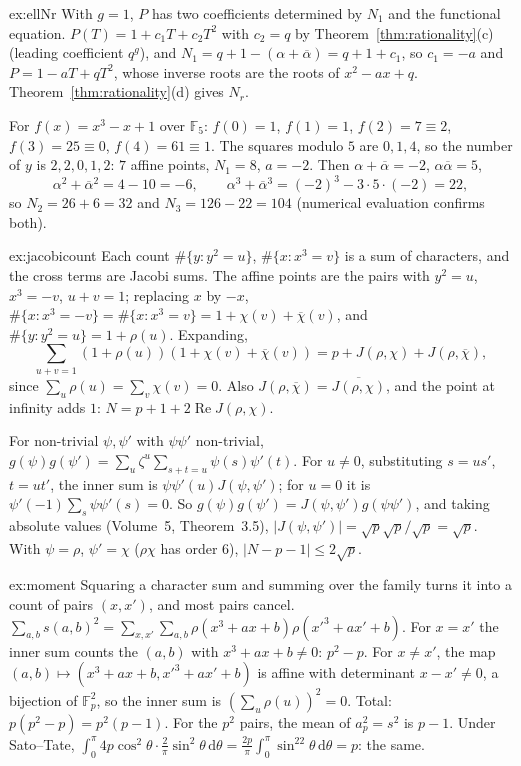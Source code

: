 \begin{solution}{ex:ellNr}
\idea With $g=1$, $P$ has two coefficients determined by $N_1$ and the functional equation.
\writeup $P(T)=1+c_1T+c_2T^2$ with $c_2=q$ by Theorem~\ref{thm:rationality}(c) (leading coefficient $q^g$), and $N_1=q+1-(\alpha+\overline\alpha)=q+1+c_1$, so
$c_1=-a$ and $P=1-aT+qT^2$, whose inverse roots are the roots of $x^2-ax+q$. Theorem~\ref{thm:rationality}(d) gives $N_r$.

For $f(x)=x^3-x+1$ over $\mathbb F_5$: $f(0)=1$, $f(1)=1$, $f(2)=7\equiv2$, $f(3)=25\equiv0$, $f(4)=61\equiv1$. The squares modulo $5$ are $0,1,4$, so the number of $y$
is $2,2,0,1,2$: $7$ affine points, $N_1=8$, $a=-2$. Then $\alpha+\overline\alpha=-2$, $\alpha\overline\alpha=5$,
\[
\alpha^2+\overline\alpha^2=4-10=-6,\qquad\alpha^3+\overline\alpha^3=(-2)^3-3\cdot5\cdot(-2)=22,
\]
so $N_2=26+6=32$ and $N_3=126-22=104$ (numerical evaluation confirms both).
\end{solution}

\begin{solution}{ex:jacobicount}
\idea Each count $\#\{y:y^2=u\}$, $\#\{x:x^3=v\}$ is a sum of characters, and the cross terms are Jacobi sums.
\writeup The affine points are the pairs with $y^2=u$, $x^3=-v$, $u+v=1$; replacing $x$ by $-x$, $\#\{x:x^3=-v\}=\#\{x:x^3=v\}=1+\chi(v)+\overline\chi(v)$, and
$\#\{y:y^2=u\}=1+\rho(u)$. Expanding,
\[
\sum_{u+v=1}(1+\rho(u))(1+\chi(v)+\overline\chi(v))=p+J(\rho,\chi)+J(\rho,\overline\chi),
\]
since $\sum_u\rho(u)=\sum_v\chi(v)=0$. Also $J(\rho,\overline\chi)=\overline{J(\rho,\chi)}$, and the point at infinity adds $1$: $N=p+1+2\operatorname{Re}J(\rho,\chi)$.

For non-trivial $\psi,\psi'$ with $\psi\psi'$ non-trivial, $g(\psi)g(\psi')=\sum_u\zeta^u\sum_{s+t=u}\psi(s)\psi'(t)$. For $u\ne0$, substituting $s=us'$, $t=ut'$, the
inner sum is $\psi\psi'(u)J(\psi,\psi')$; for $u=0$ it is $\psi'(-1)\sum_s\psi\psi'(s)=0$. So $g(\psi)g(\psi')=J(\psi,\psi')g(\psi\psi')$, and taking absolute values
(Volume~5, Theorem~3.5), $|J(\psi,\psi')|=\sqrt p\sqrt p/\sqrt p=\sqrt p$. With $\psi=\rho$, $\psi'=\chi$ ($\rho\chi$ has order $6$), $|N-p-1|\le2\sqrt p$.
\end{solution}

\begin{solution}{ex:moment}
\idea Squaring a character sum and summing over the family turns it into a count of pairs $(x,x')$, and most pairs cancel.
\writeup $\sum_{a,b}s(a,b)^2=\sum_{x,x'}\sum_{a,b}\rho(x^3+ax+b)\rho(x'^3+ax'+b)$. For $x=x'$ the inner sum counts the $(a,b)$ with $x^3+ax+b\ne0$: $p^2-p$. For
$x\ne x'$, the map $(a,b)\mapsto(x^3+ax+b,x'^3+ax'+b)$ is affine with determinant $x-x'\ne0$, a bijection of $\mathbb F_p^2$, so the inner sum is
$(\sum_u\rho(u))^2=0$. Total: $p(p^2-p)=p^2(p-1)$. For the $p^2$ pairs, the mean of $a_p^2=s^2$ is $p-1$. Under Sato--Tate,
$\int_0^\pi4p\cos^2\theta\cdot\frac2\pi\sin^2\theta\,\mathrm d\theta=\frac{2p}\pi\int_0^\pi\sin^22\theta\,\mathrm d\theta=p$: the same.
\end{solution}

